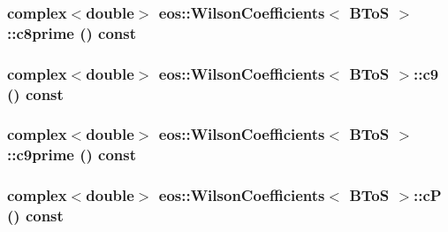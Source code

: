 \label{structeos_1_1WilsonCoefficients_3_01BToS_01_4_ad1700818a303de24c0d9aba06b9428db}
\hypertarget{structeos_1_1WilsonCoefficients_3_01BToS_01_4_abfc2ac642a0fd10464d843eb7ed8ebab}{
\subsubsection[{c8prime}]{\setlength{\rightskip}{0pt plus 5cm}complex$<$double$>$ eos::WilsonCoefficients$<$ {\bf BToS} $>$::c8prime () const}}
\label{structeos_1_1WilsonCoefficients_3_01BToS_01_4_abfc2ac642a0fd10464d843eb7ed8ebab}
\hypertarget{structeos_1_1WilsonCoefficients_3_01BToS_01_4_abd2db158ab9926a0f7be9f29ef16663f}{
\subsubsection[{c9}]{\setlength{\rightskip}{0pt plus 5cm}complex$<$double$>$ eos::WilsonCoefficients$<$ {\bf BToS} $>$::c9 () const}}
\label{structeos_1_1WilsonCoefficients_3_01BToS_01_4_abd2db158ab9926a0f7be9f29ef16663f}
\hypertarget{structeos_1_1WilsonCoefficients_3_01BToS_01_4_a633c2ff746cf0998286b396d5d6ad864}{
\subsubsection[{c9prime}]{\setlength{\rightskip}{0pt plus 5cm}complex$<$double$>$ eos::WilsonCoefficients$<$ {\bf BToS} $>$::c9prime () const}}
\label{structeos_1_1WilsonCoefficients_3_01BToS_01_4_a633c2ff746cf0998286b396d5d6ad864}
\hypertarget{structeos_1_1WilsonCoefficients_3_01BToS_01_4_af5e99da02e53255077cdf53b315c0960}{
\subsubsection[{cP}]{\setlength{\rightskip}{0pt plus 5cm}complex$<$double$>$ eos::WilsonCoefficients$<$ {\bf BToS} $>$::cP () const}}
